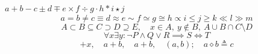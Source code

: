 \documentclass{article}
\begin{document}
$a+b-c\pm d\mp e\times f\div g\cdot h\ast i\star j$
\[a=b\ne c\equiv d\approx e\sim f\simeq g\cong h\propto i\le j\ge k\ll l\gg m\]
\[A\subset B\subseteq C\supset D\supseteq E,\quad x\in A,\ y\notin B,\ A\cup B\cap C\setminus D\]
\[\forall x\exists y:\neg P\land Q\lor R\implies S\iff T\]
\[+x,\quad a{+}b,\quad a+b,\quad (a,b);\quad a\mathbin{\diamond}b\mathrel{\triangleq}c\]
\end{document}
